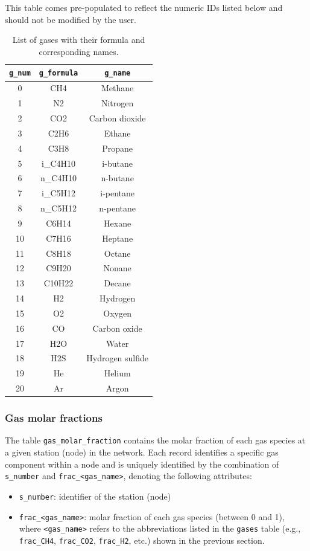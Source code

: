 This table comes pre-populated to reflect the numeric IDs listed below and should not be modified by the user.
\begin{table}[H]
    \centering
    \begin{tabular}{|c|c|c|}
    \hline
    \texttt{g\_num} & \texttt{g\_formula} & \texttt{g\_name} \\
    \hline
    0  & CH4      & Methane \\
    1  & N2       & Nitrogen \\
    2  & CO2      & Carbon dioxide \\
    3  & C2H6     & Ethane \\
    4  & C3H8     & Propane \\
    5  & i\_C4H10 & i-butane \\
    6  & n\_C4H10 & n-butane \\
    7  & i\_C5H12 & i-pentane \\
    8  & n\_C5H12 & n-pentane \\
    9  & C6H14    & Hexane \\
    10 & C7H16    & Heptane \\
    11 & C8H18    & Octane \\
    12 & C9H20    & Nonane \\
    13 & C10H22   & Decane \\
    14 & H2       & Hydrogen \\
    15 & O2       & Oxygen \\
    16 & CO       & Carbon oxide \\
    17 & H2O      & Water \\
    18 & H2S      & Hydrogen sulfide \\
    19 & He       & Helium \\
    20 & Ar       & Argon \\
    \hline
    \end{tabular}
    \caption{List of gases with their formula and corresponding names.}
\end{table}


\subsubsection{Gas molar fractions}
The table \texttt{gas\_molar\_fraction} contains the molar fraction of each gas species at a given station (node) in the network.  
Each record identifies a specific gas component within a node and is uniquely identified by the combination of \texttt{s\_number} and \texttt{frac\_<gas\_name>}, denoting the following attributes:
\begin{itemize}
    \item \texttt{s\_number}: identifier of the station (node)
    \item \texttt{frac\_<gas\_name>}: molar fraction of each gas species (between 0 and 1), where \texttt{<gas\_name>} refers to the abbreviations listed in the \texttt{gases} table (e.g., \texttt{frac\_CH4}, \texttt{frac\_CO2}, \texttt{frac\_H2}, etc.) shown in the previous section.
\end{itemize}

